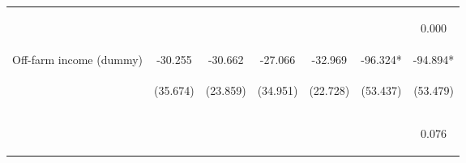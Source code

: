 \begin{center}
\begin{tabular}{lcccccc}
\vspace{4pt} & \begin{footnotesize}[0.000]\end{footnotesize} & \begin{footnotesize}[0.000]\end{footnotesize} & \begin{footnotesize}[0.000]\end{footnotesize} & \begin{footnotesize}[0.374]\end{footnotesize} & \begin{footnotesize}[0.000]\end{footnotesize} & \begin{footnotesize}0.000\end{footnotesize} \\
Off-farm income (dummy) & -30.255 & -30.662 & -27.066 & -32.969 & -96.324* & -94.894* \\
 & \begin{footnotesize}(35.674)\end{footnotesize} & \begin{footnotesize}(23.859)\end{footnotesize} & \begin{footnotesize}(34.951)\end{footnotesize} & \begin{footnotesize}(22.728)\end{footnotesize} & \begin{footnotesize}(53.437)\end{footnotesize} & \begin{footnotesize}(53.479)\end{footnotesize} \\
\vspace{4pt} & \begin{footnotesize}[0.396]\end{footnotesize} & \begin{footnotesize}[0.199]\end{footnotesize} & \begin{footnotesize}[0.439]\end{footnotesize} & \begin{footnotesize}[0.147]\end{footnotesize} & \begin{footnotesize}[0.071]\end{footnotesize} & \begin{footnotesize}0.076\end{footnotesize} \\

\end{tabular}
\end{center}
